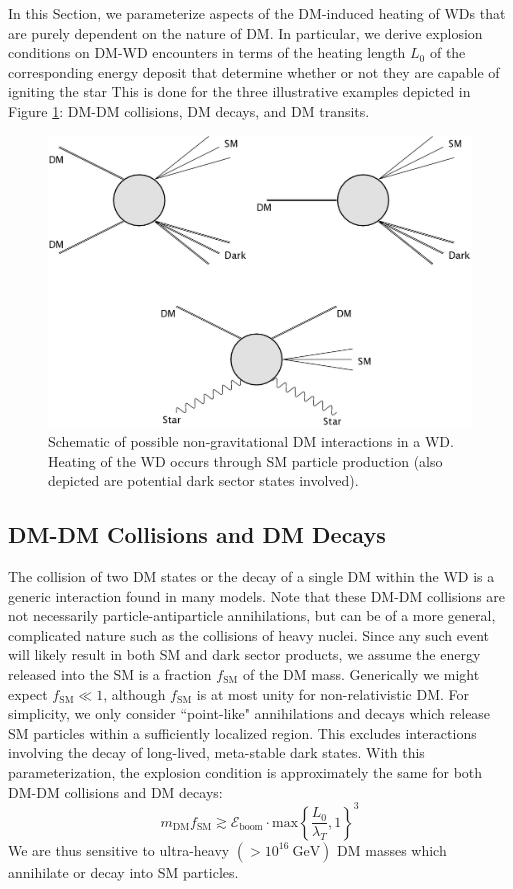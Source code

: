 \documentclass[twocolumn,preprintnumbers,amsmath,amssymb,prl, superscriptaddress]{revtex4}
\newcommand{\Eboom}{\mathcal{E}_\text{boom}}
\newcommand{\GeV}{\text{GeV}}
\begin{document}
In this Section, we parameterize aspects of the DM-induced heating of WDs that are purely dependent on the nature of DM.
In particular, we derive explosion conditions on DM-WD encounters in terms of the heating length $L_0$ of the corresponding energy deposit that determine whether or not they are capable of igniting the star
This is done for the three illustrative examples depicted in Figure \ref{fig:feynman}: DM-DM collisions, DM decays, and DM transits.
\begin{figure}
\includegraphics[scale=0.09]{feynmandiag.jpg}
\caption{Schematic of possible non-gravitational DM interactions in a WD. Heating of the WD occurs through SM particle production (also depicted are potential dark sector states involved).}
\label{fig:feynman}
\end{figure}

\subsection{DM-DM Collisions and DM Decays}
\label{sec:DMcoldecay}

The collision of two DM states or the decay of a single DM within the WD is a generic interaction found in many models.
Note that these DM-DM collisions are not necessarily particle-antiparticle annihilations, but can be of a more general, complicated nature such as the collisions of heavy nuclei.
Since any such event will likely result in both SM and dark sector products, we assume the energy released into the SM is a fraction $f_\text{SM}$ of the DM mass.
Generically we might expect $f_\text{SM} \ll 1$, although $f_\text{SM}$ is at most unity for non-relativistic DM.
For simplicity, we only consider ``point-like" annihilations and decays which release SM particles within a sufficiently localized region.
This excludes interactions involving the decay of long-lived, meta-stable dark states. 
With this parameterization, the explosion condition is approximately the same for both DM-DM collisions and DM decays:
\begin{equation}
\label{eq:coldecay}
  m_\text{DM} f_\text{SM}  \gtrsim \Eboom \cdot \text{max} \left \{\frac{L_0}{\lambda_T}, 1 \right \}^3
\end{equation}
We are thus sensitive to ultra-heavy $(> 10^{16} ~\GeV)$ DM masses which annihilate or decay into SM particles. 
\end{document}
